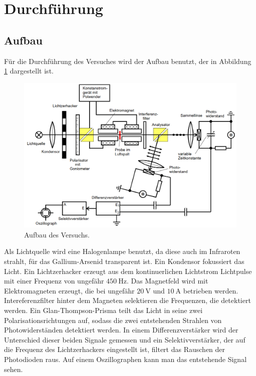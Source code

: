 \section{Durchführung}
\label{sec:Durchführung}

\subsection{Aufbau}

Für die Durchführung des Versuches wird der Aufbau benutzt, der in Abbildung \ref{fig:aufbau}
dargestellt ist. 

\begin{figure}[H]
    \centering
    \includegraphics[width=\textwidth]{Bilder/aufbau.png}
    \caption{Aufbau des Versuchs. \cite{faradayeffekt}}
    \label{fig:aufbau}
\end{figure}

Als Lichtquelle wird eine Halogenlampe benutzt, da diese auch im Infraroten strahlt, für das Gallium-Arsenid transparent ist. Ein Kondensor fokussiert das Licht. Ein Lichtzerhacker erzeugt aus dem kontinuerlichen
Lichtstrom Lichtpulse mit einer Frequenz von ungefähr $\qty{450}{\hertz}$. Das Magnetfeld wird mit Elektromagneten erzeugt, die bei ungefähr $\qty{20}{\volt}$ und $\qty{10}{\ampere}$ betrieben werden. Intereferenzfilter hinter
dem Magneten selektieren die Frequenzen, die detektiert werden. Ein Glan-Thompson-Prisma teilt das Licht in seine zwei Polarisationsrichtungen auf, sodass die zwei entstehenden Strahlen von Photowiderständen detektiert werden.
In einem Differenzverstärker wird der Unterschied dieser beiden Signale gemessen und ein Selektivverstärker, der auf die Frequenz des Lichtzerhackers eingestellt ist, filtert das Rauschen der Photodioden raus. Auf einem Oszillographen
kann man das entstehende Signal sehen. \\

